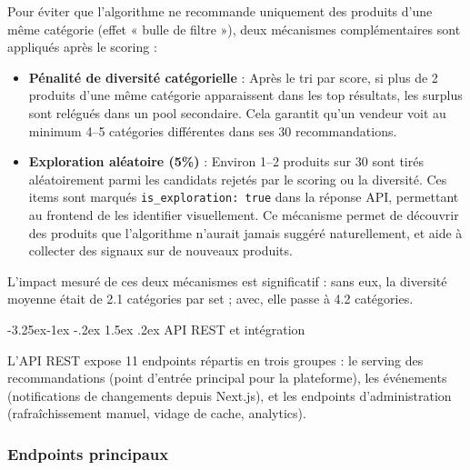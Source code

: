 \documentclass[12pt,a4paper,openany]{report}
\makeatletter
\renewcommand\subsection{\@startsection{subsection}{2}{\z@}%
  {-3.25ex\@plus -1ex \@minus -.2ex}%
  {1.5ex \@plus .2ex}%
  {\needspace{8\baselineskip}\normalfont\large\bfseries\color{primary!80!black}}}
\newcommand{\code}[1]{\texttt{#1}}
\makeatother
\begin{document}
Pour éviter que l'algorithme ne recommande uniquement des produits d'une même catégorie (effet « bulle de filtre »), deux mécanismes complémentaires sont appliqués après le scoring :

\begin{itemize}
  \item \textbf{Pénalité de diversité catégorielle} : Après le tri par score, si plus de 2 produits d'une même catégorie apparaissent dans les top résultats, les surplus sont relégués dans un pool secondaire. Cela garantit qu'un vendeur voit au minimum 4--5 catégories différentes dans ses 30 recommandations.

  \item \textbf{Exploration aléatoire (5\%)} : Environ 1--2 produits sur 30 sont tirés aléatoirement parmi les candidats rejetés par le scoring ou la diversité. Ces items sont marqués \code{is\_exploration: true} dans la réponse API, permettant au frontend de les identifier visuellement. Ce mécanisme permet de découvrir des produits que l'algorithme n'aurait jamais suggéré naturellement, et aide à collecter des signaux sur de nouveaux produits.
\end{itemize}

L'impact mesuré de ces deux mécanismes est significatif : sans eux, la diversité moyenne était de 2.1 catégories par set ; avec, elle passe à 4.2 catégories.

\subsection{API REST et intégration}

L'API REST expose 11 endpoints répartis en trois groupes : le serving des recommandations (point d'entrée principal pour la plateforme), les événements (notifications de changements depuis Next.js), et les endpoints d'administration (rafraîchissement manuel, vidage de cache, analytics).

\subsubsection{Endpoints principaux}
\end{document}
